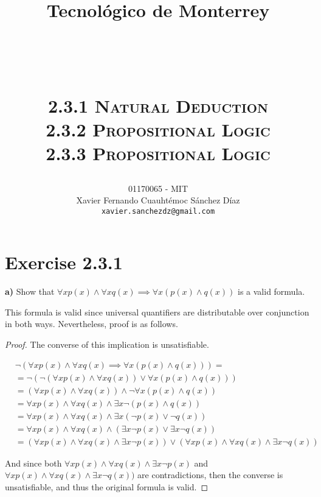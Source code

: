 \documentclass[titlepage, letterpaper, fleqn]{article}
\title{
\vspace{1in}
\textbf{Tecnológico de Monterrey} \\
\vspace{0.5in}
\textmd{\mahclass} \\
\large{\textit{\mahteacher}} \\
\vspace{0.5in}
\textsc{\mahtitle}\\
\textsc{2.3.1 Natural Deduction}\\
\textsc{2.3.2 Propositional Logic}\\
\textsc{2.3.3 Propositional Logic}\\
\author{01170065  - MIT \\
Xavier Fernando Cuauhtémoc Sánchez Díaz \\
\texttt{xavier.sanchezdz@gmail.com}}
\date{\mahdate}
}
\newcommand{\spacepls}{\vspace{5mm}}
\begin{document}
\begin{titlepage}
\maketitle
\end{titlepage}

%
%

\section{Exercise 2.3.1}

{\large \textbf{a)} Show that \(\forall x p(x) \wedge \forall x q(x) \implies \forall x (p(x) \wedge q(x))\) is a valid formula.}

\spacepls

This formula is valid since universal quantifiers are distributable over conjunction in both ways. Nevertheless, proof is as follows.

\begin{proof}
The converse of this implication is unsatisfiable.

\begin{align*}
& \neg (\forall x p(x) \wedge \forall x q(x) \implies \forall x (p(x) \wedge q(x))) = & \tag*{Converse}
\\ & = \neg (\neg (\forall x p(x) \wedge \forall x q(x)) \vee \forall x (p(x) \wedge q(x))) &\tag*{Material implication}
\\ & = (\forall x p(x) \wedge \forall x q(x)) \wedge \neg \forall x (p(x) \wedge q(x)) &\tag*{de Morgan}
\\ & = \forall x p(x) \wedge \forall x q(x) \wedge \exists x \neg (p(x) \wedge q(x)) &\tag*{Negation of \(\forall\) is \(\exists \neg\)}
\\ & = \forall x p(x) \wedge \forall x q(x) \wedge \exists x (\neg p(x) \vee \neg q(x)) &\tag*{de Morgan}
\\ & = \forall x p(x) \wedge \forall x q(x) \wedge (\exists x \neg p(x) \vee \exists x \neg q(x)) &\tag*{\(\exists\) is distributive over \(\vee\)}
\\ & = (\forall x p(x) \wedge \forall x q(x) \wedge \exists x \neg p(x)) \vee (\forall x p(x) \wedge \forall x q(x) \wedge \exists x \neg q(x)) &\tag*{\(\wedge\) is distributive over \(\vee\)}
\end{align*}

And since both \(\forall x p(x) \wedge \forall x q(x) \wedge \exists x \neg p(x)\) and \(\forall x p(x) \wedge \forall x q(x) \wedge \exists x \neg q(x))\) are contradictions, then the converse is unsatisfiable, and thus the original formula is valid.
\end{proof}
\end{document}
